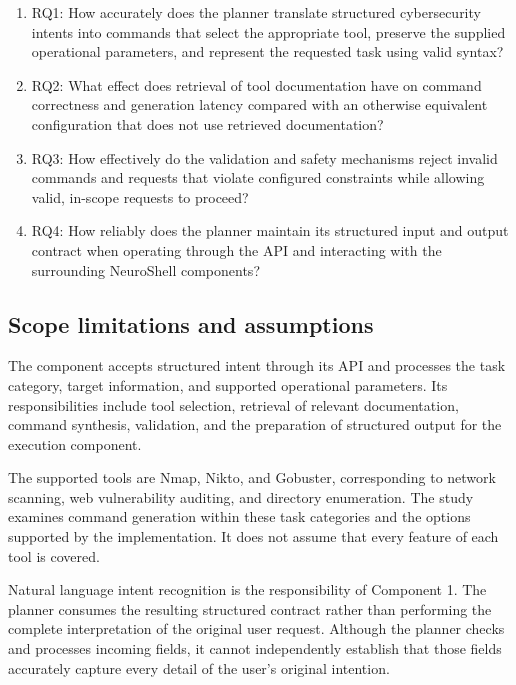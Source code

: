 \documentclass[
]{article}
\begin{document}
\begin{enumerate}
\def\labelenumi{\arabic{enumi}.}
\item
  RQ1: How accurately does the planner translate structured
  cybersecurity intents into commands that select the appropriate tool,
  preserve the supplied operational parameters, and represent the
  requested task using valid syntax?
\item
  RQ2: What effect does retrieval of tool documentation have on command
  correctness and generation latency compared with an otherwise
  equivalent configuration that does not use retrieved documentation?
\item
  RQ3: How effectively do the validation and safety mechanisms reject
  invalid commands and requests that violate configured constraints
  while allowing valid, in-scope requests to proceed?
\item
  RQ4: How reliably does the planner maintain its structured input and
  output contract when operating through the API and interacting with
  the surrounding NeuroShell components?
\end{enumerate}

\hypertarget{scope-limitations-and-assumptions}{%
\subsection{Scope limitations and
assumptions}\label{scope-limitations-and-assumptions}}

The component accepts structured intent through its API and processes
the task category, target information, and supported operational
parameters. Its responsibilities include tool selection, retrieval of
relevant documentation, command synthesis, validation, and the
preparation of structured output for the execution component.

The supported tools are Nmap, Nikto, and Gobuster, corresponding to
network scanning, web vulnerability auditing, and directory enumeration.
The study examines command generation within these task categories and
the options supported by the implementation. It does not assume that
every feature of each tool is covered.

Natural language intent recognition is the responsibility of Component
1. The planner consumes the resulting structured contract rather than
performing the complete interpretation of the original user request.
Although the planner checks and processes incoming fields, it cannot
independently establish that those fields accurately capture every
detail of the user's original intention.
\end{document}
